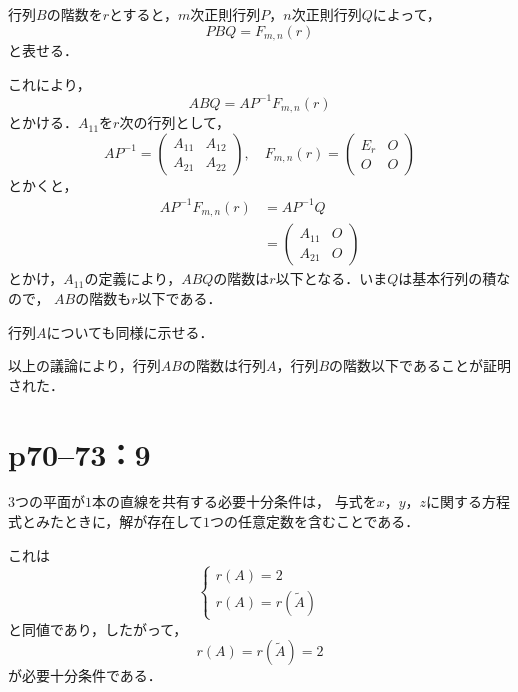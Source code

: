 \begin{tproof}
  行列$B$の階数を$r$とすると，$m$次正則行列$P$，$n$次正則行列$Q$によって，
  \[
    P B Q = F_{m,n} (r)
  \]
  と表せる．

  これにより，
  \[
    ABQ = A P^{-1} F_{m,n} (r)
  \]
  とかける．$A_{11}$を$r$次の行列として，
  \[
    A P^{-1} = \begin{pmatrix} A_{11} & A_{12} \\ A_{21} & A_{22} \end{pmatrix}, \quad F_{m,n} (r) = \begin{pmatrix} E_r & O \\ O & O \end{pmatrix}
  \]
  とかくと，
  \begin{align*}
    A P^{-1} F_{m,n} (r) & = A P^{-1} Q                                            \\
                         & = \begin{pmatrix} A_{11}& O \\ A_{21} & O \end{pmatrix}
  \end{align*}
  とかけ，$A_{11}$の定義により，$ABQ$の階数は$r$以下となる．いま$Q$は基本行列の積なので， $AB$の階数も$r$以下である．

  行列$A$についても同様に示せる．

  以上の議論により，行列$AB$の階数は行列$A$，行列$B$の階数以下であることが証明された．

\end{tproof}




\section*{p70--73：9}

\begin{tanswer}
  $3$つの平面が$1$本の直線を共有する必要十分条件は，
  与式を$x$，$y$，$z$に関する方程式とみたときに，解が存在して$1$つの任意定数を含むことである．

  これは
  \[
    \begin{cases}
      r(A)=2 \\
      r(A)=r(\tilde{A})
    \end{cases}
  \]
  と同値であり，したがって，
  \[
    r(A)=r(\tilde{A})=2
  \]
  が必要十分条件である．
\end{tanswer}




